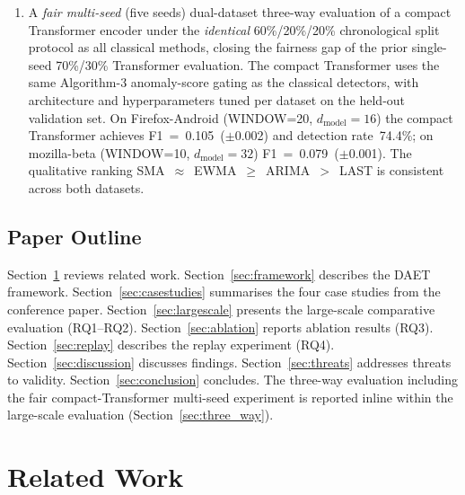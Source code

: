 \documentclass[a4paper,fleqn]{cas-sc}
\theoremstyle{plain}
\begin{document}
\begin{enumerate}
    An extended EWMA tuning grid ($\alpha \in \{0.01, 0.02, 0.03, 0.05,
    0.10, \ldots, 0.50\}$) confirms that $\alpha=0.05$ is an interior
    optimum on both datasets: smaller $\alpha$ values reduce validation F1,
    and the reported test-set results are unchanged.
  \item A \emph{fair multi-seed} (five seeds) dual-dataset three-way evaluation
    of a compact Transformer encoder under the \emph{identical}
    60\%/20\%/20\% chronological split protocol as all classical methods,
    closing the fairness gap of the prior single-seed 70\%/30\% Transformer
    evaluation.  The compact Transformer uses the same Algorithm-3
    anomaly-score gating as the classical detectors, with architecture
    and hyperparameters tuned per dataset on the held-out validation set.
    On Firefox-Android (WINDOW=20, $d_{\text{model}}=16$) the compact
    Transformer achieves F1~=~0.105~($\pm$0.002) and detection rate~74.4\%;
    on mozilla-beta (WINDOW=10, $d_{\text{model}}=32$) F1~=~0.079~($\pm$0.001).
    The qualitative ranking SMA~$\approx$~EWMA~$\geq$~ARIMA~$>$~LAST is
    consistent across both datasets.
\end{enumerate}

\subsection{Paper Outline}\label{sec:intro:outline}

Section~\ref{sec:related} reviews related work.
Section~\ref{sec:framework} describes the DAET framework.
Section~\ref{sec:casestudies} summarises the four case studies from the
conference paper.
Section~\ref{sec:largescale} presents the large-scale comparative evaluation
(RQ1--RQ2).
Section~\ref{sec:ablation} reports ablation results (RQ3).
Section~\ref{sec:replay} describes the replay experiment (RQ4).
Section~\ref{sec:discussion} discusses findings.
Section~\ref{sec:threats} addresses threats to validity.
Section~\ref{sec:conclusion} concludes.
The three-way evaluation including the fair compact-Transformer multi-seed
experiment is reported inline within the large-scale evaluation
(Section~\ref{sec:three_way}).

\section{Related Work}\label{sec:related}
\end{document}
